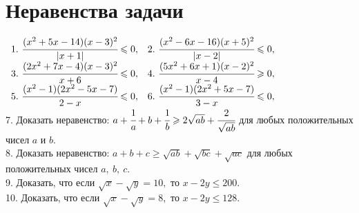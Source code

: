 \section{Неравенства задачи}
$\begin{array}{ll}
1.\ \cfrac{(x^2+5x-14)(x-3)^2}{|x+1|}\leqslant0,&
2.\ \cfrac{(x^2-6x-16)(x+5)^2}{|x-2|}\leqslant0,\\
3.\ \cfrac{(2x^2+7x-4)(x-3)^2}{x+6}\leqslant0,&
4.\ \cfrac{(5x^2+6x+1)(x-2)^2}{x-4}\geqslant0,\\
5.\ \cfrac{(x^2-1)(2x^2-5x-7)}{2-x}\leqslant0,&
6.\ \cfrac{(x^2-1)(2x^2+5x-7)}{3-x}\leqslant0,
\end{array}$\\
7. Доказать неравенство: $a+\cfrac{1}{a}+b+\cfrac{1}{b}\geqslant2\sqrt{ab}+\cfrac{2}{\sqrt{ab}}$ для любых положительных чисел $a$ и $b.$\\
8. Доказать неравенство: $a+b+c\geqslant\sqrt{ab}+\sqrt{bc}+\sqrt{ac}$ для любых положительных чисел $a,\ b,\ c.$\\
9. Доказать, что если $\sqrt{x}-\sqrt{y}=10,$ то $x-2y\leqslant 200.$\\
10. Доказать, что если $\sqrt{x}-\sqrt{y}=8,$ то $x-2y\leqslant128.$\\

